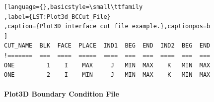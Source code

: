 \begin{center}
\begin{minipage}{0.78\textwidth}
\begin{lstlisting}[language={},basicstyle=\small\ttfamily
,label={LST:Plot3d_BCCut_File}
,caption={Plot3D interface cut file example.},captionpos=b
]
CUT_NAME  BLK  FACE  PLACE  IND1  BEG  END  IND2  BEG  END
!=======  ===  ====  =====  ====  ===  ===  ====  ===  ===
ONE         1    I    MAX     J   MIN  MAX    K   MIN  MAX
ONE         2    I    MIN     J   MIN  MAX    K   MIN  MAX
\end{lstlisting}
\end{minipage}
\end{center}





\paragraph{Plot3D Boundary Condition File}



